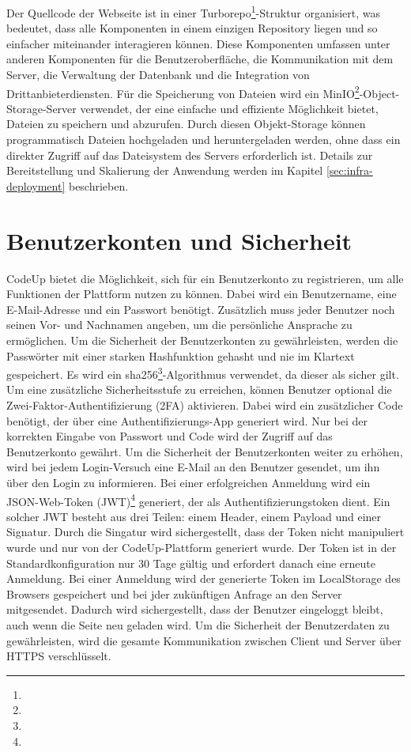 \documentclass{subfiles}
\begin{document}
Der Quellcode der Webseite ist in einer Turborepo\footnote{}-Struktur organisiert, was bedeutet, dass alle Komponenten in einem einzigen Repository liegen
und so einfacher miteinander interagieren können.
Diese Komponenten umfassen unter anderen Komponenten für die Benutzeroberfläche, die Kommunikation mit dem Server, die Verwaltung der Datenbank und die Integration von Drittanbieterdiensten.
Für die Speicherung von Dateien wird ein MinIO\footnote{}-Object-Storage-Server verwendet, der eine einfache und effiziente Möglichkeit bietet, Dateien zu speichern und abzurufen.
Durch diesen Objekt-Storage können programmatisch Dateien hochgeladen und heruntergeladen werden, ohne dass ein direkter Zugriff auf das Dateisystem des Servers erforderlich ist.
Details zur Bereitstellung und Skalierung der Anwendung werden im Kapitel \ref{sec:infra-deployment} beschrieben.


\section{Benutzerkonten und Sicherheit}\label{sec:website-security}
CodeUp bietet die Möglichkeit, sich für ein Benutzerkonto zu registrieren, um alle Funktionen der Plattform nutzen zu können.
Dabei wird ein Benutzername, eine E-Mail-Adresse und ein Passwort benötigt.
Zusätzlich muss jeder Benutzer noch seinen Vor- und Nachnamen angeben, um die persönliche Ansprache zu ermöglichen.
Um die Sicherheit der Benutzerkonten zu gewährleisten, werden die Passwörter mit einer starken Hashfunktion gehasht und nie im Klartext gespeichert.
Es wird ein sha256\footnote{}-Algorithmus verwendet, da dieser als sicher gilt.
Um eine zusätzliche Sicherheitsstufe zu erreichen, können Benutzer optional die Zwei-Faktor-Authentifizierung (2FA) aktivieren.
Dabei wird ein zusätzlicher Code benötigt, der über eine Authentifizierungs-App generiert wird.
Nur bei der korrekten Eingabe von Passwort und Code wird der Zugriff auf das Benutzerkonto gewährt.
Um die Sicherheit der Benutzerkonten weiter zu erhöhen, wird bei jedem Login-Versuch eine E-Mail an den Benutzer gesendet, um ihn über den Login zu informieren.
Bei einer erfolgreichen Anmeldung wird ein JSON-Web-Token (JWT)\footnote{} generiert, der als Authentifizierungstoken dient.
Ein solcher JWT besteht aus drei Teilen: einem Header, einem Payload und einer Signatur.
Durch die Singatur wird sichergestellt, dass der Token nicht manipuliert wurde und nur von der CodeUp-Plattform generiert wurde.
Der Token ist in der Standardkonfiguration nur 30 Tage gültig und erfordert danach eine erneute Anmeldung.
Bei einer Anmeldung wird der generierte Token im LocalStorage des Browsers gespeichert und bei jder zukünftigen Anfrage an den Server mitgesendet.
Dadurch wird sichergestellt, dass der Benutzer eingeloggt bleibt, auch wenn die Seite neu geladen wird.
Um die Sicherheit der Benutzerdaten zu gewährleisten, wird die gesamte Kommunikation zwischen Client und Server über HTTPS verschlüsselt.
\end{document}
